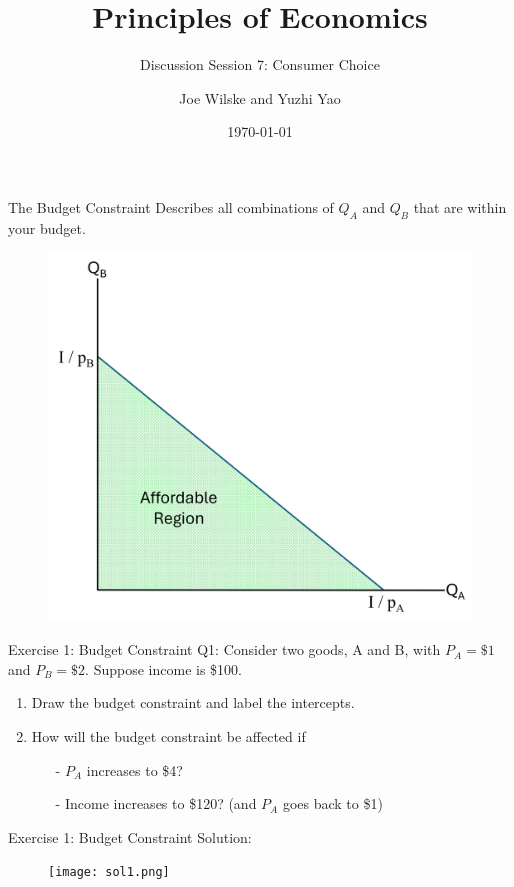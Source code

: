 \documentclass[9pt, handout]{beamer}
\title{Principles of Economics}
\subtitle{Discussion Session 7: Consumer Choice}
\author{Joe Wilske and Yuzhi Yao}
\institute{Boston College}
\date{\today}
\begin{document}
\frame{\titlepage}

\begin{frame}{The Budget Constraint}
    Describes all combinations of $Q_A$ and $Q_B$ that are within your budget.
    \begin{figure}
        \centering
        \includegraphics[width=0.65\linewidth]{budget_region.png}
    \end{figure}
\end{frame}

\begin{frame}{Exercise 1: Budget Constraint}
    Q1: Consider two goods, A and B, with $P_A=\$1$ and $P_B=\$2$. Suppose income is \$100. 
    \vspace{7pt}
    \begin{enumerate}
        \item Draw the budget constraint and label the intercepts.
        \vspace{7pt}
        \item How will the budget constraint be affected if 
        \vspace{5pt}
        \begin{itemize}
            \item[-] $P_A$ increases to \$4?
            \vspace{5pt}
            \item[-] Income increases to \$120? (and $P_A$ goes back to \$1)
        \end{itemize}
    \end{enumerate}
    \vspace{1.5in}
\end{frame}

\begin{frame}{Exercise 1: Budget Constraint}
    Solution: 
    \begin{figure}
        \centering
        \texttt{[image: sol1.png]}
    \end{figure}
\end{frame}
\end{document}
